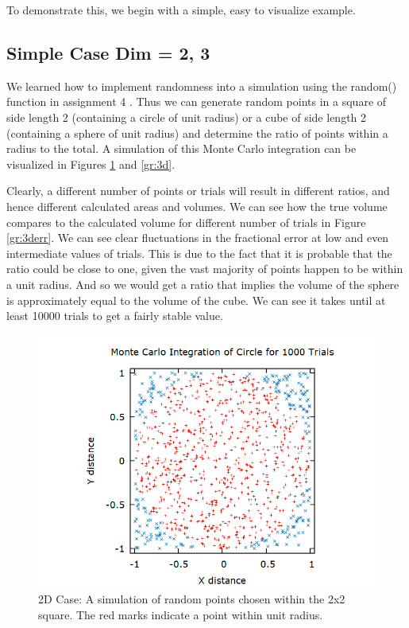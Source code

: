 \documentclass[aps,prl,twocolumn,superscriptaddress]{revtex4-1}
\begin{document}
To demonstrate this, we begin with a simple, easy to visualize example.

\subsection{Simple Case Dim = 2, 3}

We learned how to implement randomness into a simulation using the random() function in assignment 4 \cite{rand}. Thus we can generate random points in a square of side length 2 (containing a circle of unit radius) or a cube of side length 2 (containing a sphere of unit radius) and determine the ratio of points within a radius to the total. A simulation of this Monte Carlo integration can be visualized in Figures \ref{gr:2d} and \ref{gr:3d}.

Clearly, a different number of points or trials will result in different ratios, and hence different calculated areas and volumes. We can see how the true volume compares to the calculated volume for different number of trials in Figure \ref{gr:3derr}. We can see clear fluctuations in the fractional error at low and even intermediate values of trials. This is due to the fact that it is probable that the ratio could be close to one, given the vast majority of points happen to be within a unit radius. And so we would get a ratio that implies the volume of the sphere is approximately equal to the volume of the cube. We can see it takes until at least 10000 trials to get a fairly stable value. 

\begin{figure}[htbp]
  	\begin{center}
 		\includegraphics[scale=0.33]{pond2.png}
  		\caption{2D Case: A simulation of random points chosen within the 2x2 square. The red marks indicate a point within unit radius.}
  		\label{gr:2d}
 	\end{center}
\end{figure}
\end{document}
